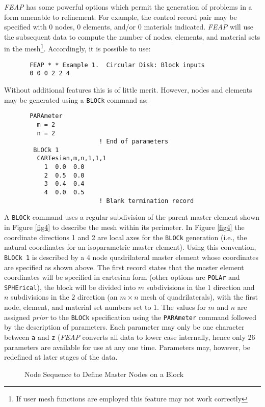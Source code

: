 {\sl FEAP} has some powerful options which permit the generation of
problems in a form amenable to refinement.  For example, the control
record pair may be specified with 0 nodes, 0 elements, and/or 0 materials
indicated.  {\sl FEAP} will
use the subsequent data to compute the number of nodes, elements, and material
sets in the
mesh\footnote{If user mesh functions are employed this feature may
not work correctly}.  Accordingly, it is possible to use:
\begin{verbatim}
       FEAP * * Example 1.  Circular Disk: Block inputs
       0 0 0 2 2 4
\end{verbatim}
Without additional features this is of little merit.  However, nodes
and elements may be generated using a {\tt BLOCk} command as:
\begin{verbatim}
       PARAmeter
         m = 2
         n = 2
                          ! End of parameters
        BLOCk 1
         CARTesian,m,n,1,1,1
           1  0.0  0.0
           2  0.5  0.0
           3  0.4  0.4
           4  0.0  0.5
                          ! Blank termination record
\end{verbatim}
A {\tt BLOCk}  command uses a regular subdivision of the parent master
element shown in Figure \ref{fig4} to describe the mesh within its perimeter.
In Figure \ref{fig4} the coordinate directions 1 and 2 are local axes for
the {\tt BLOCk} generation (i.e., the natural coordinates for an isoparametric
master element). Using this convention, {\tt BLOCk 1} is described
by a 4 node quadrilateral master element whose coordinates are specified
as shown above.  The first record states that the master element coordinates
will be specified in cartesian form (other options are {\tt POLAr} and
{\tt SPHErical}), the block will be divided into
$m$ subdivisions in the 1 direction and $n$ subdivisions in the $2$
direction (an $m \times n$ mesh of
quadrilaterals), with the first node, element, and material set
numbers set to 1. The values for $m$ and $n$ are assigned {\it prior} to the
{\tt BLOCk} specification using the {\tt PARAmeter} command followed by
the description of parameters.  Each parameter may only be one
character between {\tt a} and {\tt z} ({\sl FEAP} converts all data to lower
case internally, hence only 26 parameters are available for use at any one
time.  Parameters may, however, be redefined at later stages of the data.

\begin{figure}[ht!]
\epsfxsize=2.8in
\centerline {\hfil {} \hfil}
\caption{Node Sequence to Define Master Nodes on a Block}
\label{fig5}
\end{figure}

